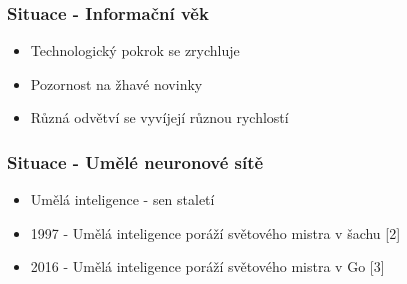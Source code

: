 \documentclass[10pt, t]{beamer}
\begin{document}
\begin{frame}

\frametitle{Situace - Informační věk}

\begin{itemize}
	\item Technologický pokrok se zrychluje
	\item<2-> Pozornost na žhavé novinky
	\item<3-> Různá odvětví se vyvíjejí různou rychlostí
\end{itemize}


\end{frame}


\begin{frame}

\frametitle{Situace - Umělé neuronové sítě}

\begin{itemize}
	\item Umělá inteligence - sen staletí
	\item 1997 - Umělá inteligence poráží světového mistra v šachu [2]
	\item 2016 - Umělá inteligence poráží světového mistra v Go [3]
\end{itemize}

\end{frame}

\end{document}
